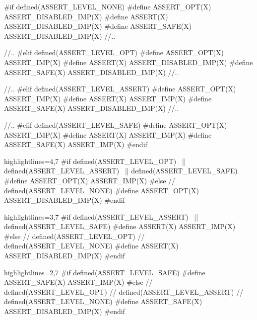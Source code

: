 \begin{frame}[fragile]
\begin{overprint}
\begin{cppcodebox}
#if defined(ASSERT_LEVEL_NONE)
#define ASSERT_OPT(X)  ASSERT_DISABLED_IMP(X)
#define ASSERT(X)      ASSERT_DISABLED_IMP(X)
#define ASSERT_SAFE(X) ASSERT_DISABLED_IMP(X)
//..  
\end{cppcodebox}

\begin{cppcodebox}
//..
#elif defined(ASSERT_LEVEL_OPT)
#define ASSERT_OPT(X)  ASSERT_IMP(X)
#define ASSERT(X)      ASSERT_DISABLED_IMP(X)
#define ASSERT_SAFE(X) ASSERT_DISABLED_IMP(X)
//..  
\end{cppcodebox}

\begin{cppcodebox}
//..
#elif defined(ASSERT_LEVEL_ASSERT)
#define ASSERT_OPT(X)  ASSERT_IMP(X)
#define ASSERT(X)      ASSERT_IMP(X)
#define ASSERT_SAFE(X) ASSERT_DISABLED_IMP(X)
//..  
\end{cppcodebox}

\begin{cppcodebox}
//..
#elif defined(ASSERT_LEVEL_SAFE)
#define ASSERT_OPT(X)  ASSERT_IMP(X)
#define ASSERT(X)      ASSERT_IMP(X)
#define ASSERT_SAFE(X) ASSERT_IMP(X)
#endif
\end{cppcodebox}

\begin{cppcodebox*}{highlightlines={4,7}}
#if defined(ASSERT_LEVEL_OPT)    \
 || defined(ASSERT_LEVEL_ASSERT) \
 || defined(ASSERT_LEVEL_SAFE)
#define ASSERT_OPT(X) ASSERT_IMP(X)
#else
 // defined(ASSERT_LEVEL_NONE)
#define ASSERT_OPT(X) ASSERT_DISABLED_IMP(X)
#endif
\end{cppcodebox*}

\begin{cppcodebox*}{highlightlines={3,7}}
#if defined(ASSERT_LEVEL_ASSERT) \
 || defined(ASSERT_LEVEL_SAFE)
#define ASSERT(X) ASSERT_IMP(X)
#else
 // defined(ASSERT_LEVEL_OPT)
 // defined(ASSERT_LEVEL_NONE)
#define ASSERT(X) ASSERT_DISABLED_IMP(X)
#endif
\end{cppcodebox*}

\begin{cppcodebox*}{highlightlines={2,7}}
#if defined(ASSERT_LEVEL_SAFE)
#define ASSERT_SAFE(X) ASSERT_IMP(X)
#else
 // defined(ASSERT_LEVEL_OPT)
 // defined(ASSERT_LEVEL_ASSERT)
 // defined(ASSERT_LEVEL_NONE)
#define ASSERT_SAFE(X) ASSERT_DISABLED_IMP(X)
#endif
\end{cppcodebox*}

\end{overprint}
\end{frame}


